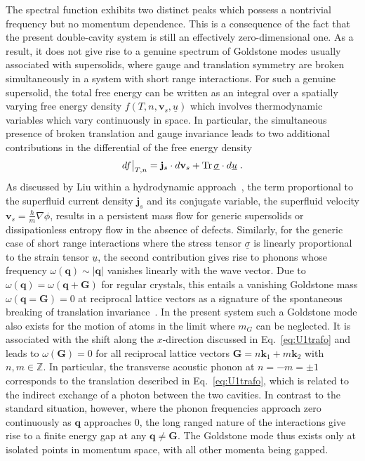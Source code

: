 \documentclass[12pt]{iopart}
\begin{document}
The spectral function exhibits two distinct peaks which possess a nontrivial frequency but no momentum dependence. 
This is a consequence of the fact that the present double-cavity system is still an effectively zero-dimensional one. 
As a result, it does not give rise to a genuine spectrum of Goldstone modes usually associated with supersolids, 
where gauge and translation symmetry are broken simultaneously in a system with short range interactions. 
For such a genuine supersolid, the total free energy can be written as an integral over a spatially varying free
energy density $f(T,n,\mathbf{v}_s,\underline{u})$ which involves thermodynamic variables which vary continuously in space. 
In particular, the simultaneous presence of broken translation and gauge invariance leads to 
two additional contributions in the differential of the free energy density
\begin{align}
df\big|_{T,n}=\mathbf{j}_s\cdot d\mathbf{v}_s+{\rm Tr}\, \underline{\sigma}\cdot d \underline{u}\;.
\end{align}
As discussed by Liu within a hydrodynamic approach~\cite{liu1978}, the term proportional to the superfluid 
current density $\mathbf{j}_s$ and its conjugate variable, the  
superfluid velocity $\mathbf{v}_s=\frac{\hbar}{m}\nabla\phi$, results in a persistent mass flow for
generic supersolids or dissipationless entropy flow in the absence of defects. 
Similarly, for the generic case of short range interactions where the stress tensor $\underline{\sigma}$ 
is linearly proportional to the strain tensor $\underline{u}$,
the second contribution gives rise to phonons whose frequency $\omega(\mathbf{q})\sim |\mathbf{q}|$ vanishes linearly with 
the wave vector. Due to  $\omega(\mathbf{q})=\omega(\mathbf{q}+\mathbf{G})$ for regular crystals, this entails
a vanishing Goldstone mass $\omega(\mathbf{q}=\mathbf{G})=0$ at reciprocal lattice vectors as a signature
of the spontaneous breaking of translation invariance~\cite{wagner1966}. In the present system such a Goldstone mode 
also exists for the motion of atoms in the limit where $m_G$ can be neglected. 
It is associated with the shift along the $x$-direction discussed in Eq.~\eqref{eq:U1trafo} and leads to $\omega(\mathbf{G})=0$ for all reciprocal lattice vectors $\mathbf{G}=n\mathbf{k}_1+m\mathbf{k}_2$ with $n,m \in \mathbb{Z}$. In particular, the transverse acoustic phonon at $n=-m=\pm1$ corresponds to the translation described in Eq.~\eqref{eq:U1trafo}, which is related to the indirect exchange of a photon between the two cavities.
In contrast to the standard situation, however, where the phonon frequencies approach zero continuously as $\mathbf{q}$ approaches $0$, the long ranged nature of the interactions give rise to a finite energy gap at any $\mathbf{q}\neq\mathbf{G}$. The Goldstone mode thus exists only at isolated points in momentum space, with all other momenta being gapped.
\end{document}
